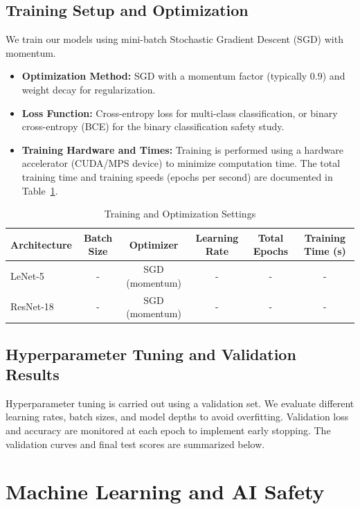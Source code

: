 \documentclass{name}
\begin{document}
\subsection{Training Setup and Optimization}
We train our models using mini-batch Stochastic Gradient Descent (SGD) with momentum. 
\begin{itemize}
    \item \textbf{Optimization Method:} SGD with a momentum factor (typically $0.9$) and weight decay for regularization.
    \item \textbf{Loss Function:} Cross-entropy loss for multi-class classification, or binary cross-entropy (BCE) for the binary classification safety study.
    \item \textbf{Training Hardware and Times:} Training is performed using a hardware accelerator (CUDA/MPS device) to minimize computation time. The total training time and training speeds (epochs per second) are documented in Table~\ref{tab:training_metrics}.
\end{itemize}

\begin{table}[H]
\centering
\caption{Training and Optimization Settings}
\label{tab:training_metrics}
\begin{tabular}{lccccc}
\toprule
Architecture & Batch Size & Optimizer & Learning Rate & Total Epochs & Training Time (s) \\
\midrule
LeNet-5 & - & SGD (momentum) & - & - & - \\
ResNet-18 & - & SGD (momentum) & - & - & - \\
\bottomrule
\end{tabular}
\end{table}

\subsection{Hyperparameter Tuning and Validation Results}
Hyperparameter tuning is carried out using a validation set. We evaluate different learning rates, batch sizes, and model depths to avoid overfitting. 
Validation loss and accuracy are monitored at each epoch to implement early stopping.
The validation curves and final test scores are summarized below.


\section{Machine Learning and AI Safety}
\end{document}
